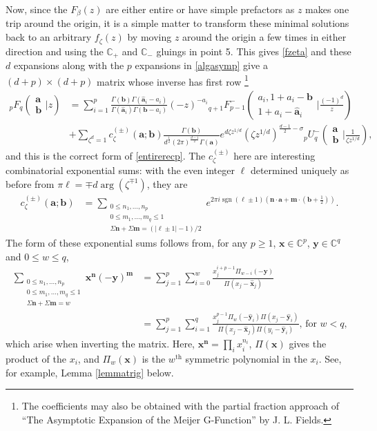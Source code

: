 \documentclass[12pt]{article}
\newcommand{\ee}[0] {e}
\newcommand{\ii}[0] {i}
\numberwithin{equation}{section}
\newcommand{\FF}[6] {{}_{#1}{#2}_{#3} \left( \begin{array}{c} #4 \\ #5 \end{array} \Big| #6  \right)}
\newcommand{\FFe}[7] {{}_{#1}^{\,}{#2}_{#3}^{#4} \left( \begin{array}{c} #5 \\ #6 \end{array} \Big| #7 \right)}
\newcommand{\bfa}[0] {\mathbf{a}}
\newcommand{\bfb}[0] {\mathbf{b}}
\newcommand{\bfm}[0] {\mathbf{m}}
\newcommand{\bfn}[0] {\mathbf{n}}
\newcommand{\bfx}[0] {\mathbf{x}}
\newcommand{\bfy}[0] {\mathbf{y}}
\begin{document}
Now, since the $F_{\beta}(z)$ are either entire or have simple prefactors as $z$ makes one trip around the origin, it is a simple matter to transform these minimal solutions back to an arbitrary $f_{\zeta}(z)$ by moving $z$ around the origin a few times in either direction and using the $\mathbb{C}_{+}$ and $\mathbb{C}_{-}$ gluings in point 5. This gives \eqref{fzeta} and these $d$ expansions along with the $p$ expansions in \eqref{algasymp} give a $(d+p)\times(d+p)$ matrix whose inverse has first row \footnote{The coefficients may also be obtained with the partial fraction approach of ``The Asymptotic Expansion of the Meijer G-Function'' by J. L. Fields.}
\begin{equation}
\label{entirerecp2}
\begin{alignedat}{1}
\FF{p}{F}{q}{\mathbf{a}}{\mathbf{b}}{z}&=\sum_{i=1}^{p} \frac{\Gamma(\mathbf{b}) \Gamma(\hat{\mathbf{a}}_i-a_i)}{\Gamma(\hat{\mathbf{a}}_i)\Gamma(\mathbf{b}-a_i)} (-z)^{-a_i} \FFe{q+1}{F}{p-1}{-}{a_i,1+a_i-\mathbf{b}}{1+a_i-\hat{\mathbf{a}}_i}{\frac{(-1)^d}{z}}\\
&+\sum_{\zeta^d=1} c_{\zeta}^{(\pm)} (\bfa; \bfb) \frac{\Gamma(\mathbf{b})}{d^{\frac{1}{2}} (2 \pi )^{\frac{d-1}{2}} \Gamma(\mathbf{a})} \ee^{d \zeta z^{1/d}}(\zeta z^{1/d})^{\frac{d-1}{2}-\sigma} \FFe{p}{U}{q}{-}{\bfa}{\bfb}{\frac{1}{\zeta z^{1/d}}}\text{,}
\end{alignedat}
\end{equation}
and this is the correct form of \eqref{entirerecp}. The $c_{\zeta}^{(\pm)}$ here are interesting combinatorial exponential sums: with the even integer $\ell$ determined uniquely as before from $\pi \ell = \mp d \arg(\zeta^{\mp1})$, they are
\begin{align*}
c_{\zeta}^{(\pm)}(\bfa; \bfb) &=\sum_{\substack{0 \le n_1, \dots, n_p \\ 0 \le m_1, \dots, m_q \le 1 \\ \Sigma \bfn + \Sigma \bfm = (|\ell \pm 1|-1)/2}}{ \ee^{2\pi \ii \operatorname{sgn}\left(\ell\pm 1\right) (\bfn \cdot \bfa + \mathbf{m} \cdot (\bfb + \frac{1}{2}))}}\text{.}
\end{align*}
The form of these exponential sums follows from, for any $p \ge 1$, $\bfx \in \mathbb{C}^p$, $\bfy \in \mathbb{C}^q$ and $0 \le w \le q$,
\begin{align*}
\sum_{\substack{0 \le n_1, \dots, n_p \\ 0 \le m_1, \dots, m_q \le 1 \\ \Sigma \bfn + \Sigma \bfm = w}}{ \bfx^\bfn (-\bfy)^\bfm} &= \sum_{j=1}^{p}\sum_{i=0}^{w} \frac{x_j^{i+p-1} \Pi_{w-i}(-\bfy)}{\Pi (x_j-\hat{\bfx}_j)}\\
&=\sum_{j=1}^{p} \sum_{i=1}^{q} \frac{x_j^{p-1} \Pi_w(-\hat{\bfy}_i) \Pi(x_j-\hat{\bfy}_i)}{\Pi(x_j - \hat{\bfx}_j) \Pi (y_i-\hat{\bfy}_i)}\text{, for } w < q\text{,}
\end{align*}
which arise when inverting the matrix. Here, $\bfx^{\bfn} = \prod_i x_i^{n_i}$, $\Pi(\bfx)$ gives the product of the $x_i$, and $\Pi_w(\bfx)$ is the $w^{\text{th}}$ symmetric polynomial in the $x_i$. See, for example, Lemma \ref{lemmatrig} below.
\end{document}

